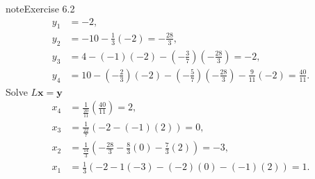 \documentclass[letterpaper,10pt,english]{jupyterBook}
\begin{document}
\begin{sphinxadmonition}{note}{Exercise 6.2}
\begin{align*}
    y_{1} &= -2, \\
    y_{2} &= -10 - \frac{1}{3}\left(-2\right) = - \frac{28}{3}, \\
    y_{3} &= 4 - \left(-1\right)\left(-2\right) - \left(- \frac{3}{7}\right)\left(- \frac{28}{3}\right) = -2, \\
    y_{4} &= 10 - \left(- \frac{2}{3}\right)\left(-2\right) - \left(- \frac{5}{7}\right)\left(- \frac{28}{3}\right) - \frac{9}{11}\left(-2\right) = \frac{40}{11}.
\end{align*}
\sphinxAtStartPar
Solve \(L \mathbf{x} = \mathbf{y}\)
\begin{align*}
    x_{4} &= \frac{1}{\frac{20}{11}}\left(\frac{40}{11}\right) = 2, \\
    x_{3} &= \frac{1}{\frac{22}{7}}\left(-2 - \left(-1\right)\left(2\right)\right) = 0, \\
    x_{2} &= \frac{1}{\frac{14}{3}}\left(- \frac{28}{3} - \frac{8}{3}\left(0\right) - \frac{7}{3}\left(2\right)\right) = -3, \\
    x_{1} &= \frac{1}{3}\left(-2 - 1\left(-3\right) - \left(-2\right)\left(0\right) - \left(-1\right)\left(2\right)\right) = 1.
\end{align*}\end{sphinxadmonition}
\end{document}

